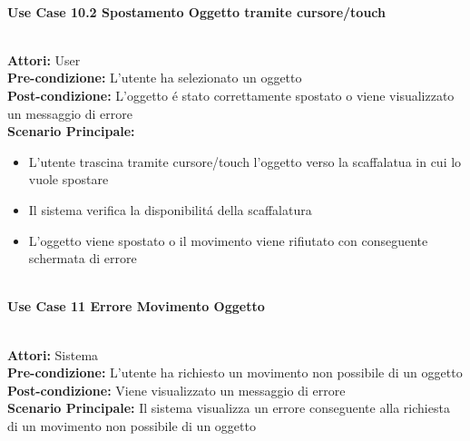 \vspace{0.5cm}

\Large\textbf{}\\
\Large\textbf{Use Case 10.2 Spostamento Oggetto tramite cursore/touch} \\

\vspace{0.5cm}

\large\textbf{} \\
\textbf{Attori:} User\\
\textbf{Pre-condizione:} L'utente ha selezionato un oggetto \\
\textbf{Post-condizione: } L'oggetto é stato correttamente spostato o viene visualizzato un messaggio di errore\\
\textbf{Scenario Principale:} 
\begin{itemize}
    \item L'utente trascina tramite cursore/touch l'oggetto verso la scaffalatua in cui lo vuole spostare
    \item Il sistema verifica la disponibilitá della scaffalatura
    \item L'oggetto viene spostato o il movimento viene rifiutato con conseguente schermata di errore
\end{itemize}

\vspace{0.5cm}

\Large\textbf{}\\
\Large\textbf{Use Case 11 Errore Movimento Oggetto} \\

\vspace{0.5cm}

\large\textbf{} \\
\textbf{Attori:} Sistema\\
\textbf{Pre-condizione:} L'utente ha richiesto un movimento non possibile di un oggetto  \\
\textbf{Post-condizione: } Viene visualizzato un messaggio di errore\\
\textbf{Scenario Principale:} 
Il sistema visualizza un errore conseguente alla richiesta di un movimento non possibile di un oggetto

\vspace{0.5cm}


